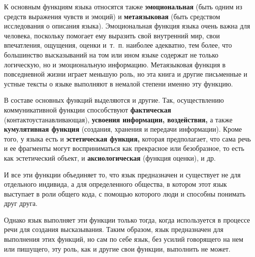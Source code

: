 К основным функциям языка относятся также \textbf{эмоциональная} (быть одним из средств выражения чувств и эмоций) и \textbf{метаязыковая} (быть средством исследования о описания языка).
Эмоциональная функция языка очень важна для человека, поскольку помогает ему выразить свой внутренний мир, свои впечатления, ощущения, оценки и~т.~п. наиболее адекватно, тем более, что большинство высказываний на том или ином языке содержат не только логическую, но и эмоциональную информацию.
Метаязыковая функция в повседневной жизни играет меньшую роль, но эта книга и другие письменные и устные тексты о языке выполняют в немалой степени именно эту функцию.

В составе основных функций выделяются и другие.
Так, осуществлению коммуникативной функции способствуют \textbf{фактическая} (контактоустанавливающая), \textbf{усвоения информации, воздействия,} а также \textbf{кумулятивная функция} (создания, хранения и передачи информации).
Кроме того, у языка есть и \textbf{эстетическая функция,} которая предполагает, что сама речь и ее фрагменты могут восприниматься как прекрасное или безобразное, то есть как эстетический объект, и \textbf{аксиологическая} (функция оценки), и др.

И все эти функции объединяет то, что язык предназначен и существует не для отдельного индивида, а для определенного общества, в котором этот язык выступает в роли общего кода, с помощью которого люди и способны понимать друг друга.

Однако язык выполняет эти функции только тогда, когда используется в процессе речи для создания высказывания.
Таким образом, язык предназначен для выполнения этих функций, но сам по себе язык, без усилий говорящего на нем или пишущего, эту роль, как и другие свои функции, выполнить не может.
